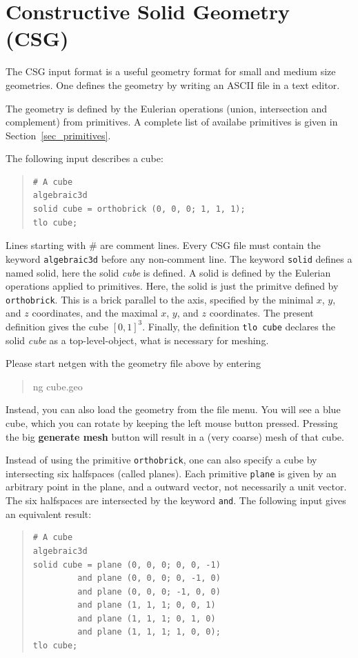 \documentclass[12pt]{book}
\begin{document}
\chapter{Constructive Solid Geometry (CSG)}
\label{chap_csg}
%
The CSG input format is a useful geometry format for small and
medium size geometries. One defines the geometry by writing an
ASCII file in a text editor.

The geometry is defined by the Eulerian operations (union,
intersection and complement) from primitives. A complete list of
availabe primitives is given in Section~\ref{sec_primitives}.

The following input describes a cube:
\begin{quote}
\begin{verbatim}
# A cube
algebraic3d
solid cube = orthobrick (0, 0, 0; 1, 1, 1);
tlo cube;
\end{verbatim}
\end{quote}
Lines starting with $\#$ are comment lines. Every CSG file must contain the
keyword {\tt algebraic3d} before any non-comment line.
The keyword {\tt solid} defines a named solid, here the solid {\it cube}
is defined. A solid is defined by the Eulerian operations applied to 
primitives. Here, the solid is just the primitve defined by {\tt orthobrick}.
This is a brick parallel to the axis, specified by the minimal $x$, $y$, and
$z$ coordinates, and the maximal $x$, $y$, and $z$ coordinates. The present
definition gives the cube $[0,1]^3$. Finally, the definition {\tt tlo cube}
declares the solid {\it cube} as a top-level-object, what is necessary for
meshing.

Please start netgen with the geometry file above by entering
\begin{quote}
ng cube.geo
\end{quote}
Instead, you can also load the geometry from the file menu. You will
see a blue cube, which you can rotate by keeping the left mouse button
pressed. Pressing the big {\bf generate mesh} button will result in a
(very coarse) mesh of that cube. 

Instead of using the primitive {\tt orthobrick}, one can also specify
a cube by intersecting six halfspaces (called planes). Each primitive
{\tt plane} is given by an arbitrary point in the plane, and a outward
vector, not necessarily a unit vector. The six halfspaces are intersected
by the keyword {\tt and}. The following input gives an equivalent result:

\begin{quote}
\begin{verbatim}
# A cube
algebraic3d
solid cube = plane (0, 0, 0; 0, 0, -1) 
         and plane (0, 0, 0; 0, -1, 0)
         and plane (0, 0, 0; -1, 0, 0)
         and plane (1, 1, 1; 0, 0, 1)
         and plane (1, 1, 1; 0, 1, 0)
         and plane (1, 1, 1; 1, 0, 0);
tlo cube;
\end{verbatim}
\end{quote}
\end{document}
